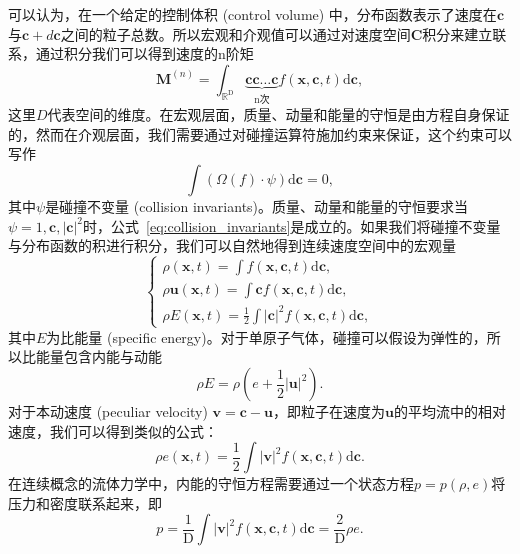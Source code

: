 可以认为，在一个给定的控制体积 (control volume) 中，分布函数表示了速度在$\mathbf{c}$与$\mathbf{c}+d\mathbf{c}$之间的粒子总数。所以宏观和介观值可以通过对速度空间$\mathbf{C}$积分来建立联系，通过积分我们可以得到速度的n阶矩
\begin{equation}
    \boldsymbol{M}^{(n)}=\int_{\mathbb{R}^{\mathrm{D}}} \underbrace{\mathbf{c} \mathbf{c} \ldots \mathbf{c}}_{\mathrm{n} \text {次}} f(\boldsymbol{x}, \mathbf{c}, t) \mathrm{d} \mathbf{c},
\end{equation}
这里$D$代表空间的维度。在宏观层面，质量、动量和能量的守恒是由方程自身保证的，然而在介观层面，我们需要通过对碰撞运算符施加约束来保证，这个约束可以写作
\begin{equation}
    \int\left(\Omega(f) \cdot \psi\right) \mathrm{d} \mathbf{c}=0,
    \label{eq:collision_invariants}
\end{equation}
其中$\psi$是碰撞不变量 (collision invariants)。质量、动量和能量的守恒要求当$\psi=1, \mathbf{c}, |\mathbf{c}|^2$时，公式~\ref{eq:collision_invariants}是成立的。如果我们将碰撞不变量与分布函数的积进行积分，我们可以自然地得到连续速度空间中的宏观量
\begin{equation}
    \left\{
        \begin{array}
        {l}\rho(\boldsymbol{x}, t)=\int f(\boldsymbol{x}, \mathbf{c}, t) \mathrm{d} \mathbf{c} , \\
        \rho \boldsymbol{u}(\boldsymbol{x}, t)=\int \mathbf{c} f(\boldsymbol{x}, \mathbf{c}, t) \mathrm{d} \mathbf{c} , \\
        \rho E(\boldsymbol{x}, t)=\frac{1}{2} \int|\mathbf{c}|^2 f(\boldsymbol{x}, \mathbf{c}, t) \mathrm{d} \mathbf{c} ,
        \end{array}
    \right.
\end{equation}
其中$E$为比能量 (specific energy)。对于单原子气体，碰撞可以假设为弹性的，所以比能量包含内能与动能
\begin{equation}
    \rho E=\rho\left(e+\frac{1}{2}|\boldsymbol{u}|^2\right).
\end{equation}
对于本动速度 (peculiar velocity) $\boldsymbol{v}=\mathbf{c}-\boldsymbol{u}$，即粒子在速度为$\boldsymbol{u}$的平均流中的相对速度，我们可以得到类似的公式：
\begin{equation}
    \rho e(\boldsymbol{x}, t)=\frac{1}{2} \int|\boldsymbol{v}|^2 f(\boldsymbol{x}, \mathbf{c}, t) \mathrm{d} \mathbf{c}.
\end{equation}
在连续概念的流体力学中，内能的守恒方程需要通过一个状态方程$p=p(\rho,e)$将压力和密度联系起来，即
\begin{equation}
    p=\frac{1}{\mathrm{D}} \int|\boldsymbol{v}|^2 f(\boldsymbol{x}, \mathbf{c}, t) \mathrm{d} \mathbf{c}=\frac{2}{\mathrm{D}} \rho e.
    \label{eq:eos}
\end{equation}
